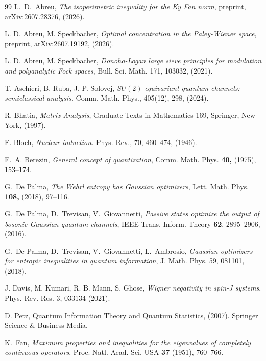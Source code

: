 \documentclass[12pt]{amsart}
\theoremstyle{plain}
\theoremstyle{definition}
\theoremstyle{remark}
\numberwithin{equation}{section}
\newcommand{\1}{\mathbf 1}
\begin{document}
\begin{thebibliography}{99}
 {\small L.~D.~Abreu, \emph{The isoperimetric inequality
for the Ky Fan norm}, preprint, \qquad arXiv:2607.28376, (2026). }

 {\small L. D. Abreu, M. Speckbacher, \emph{Optimal
concentration in the Paley-Wiener space}, preprint, \qquad arXiv:2607.19192,
(2026).}

 {\small L. D. Abreu, M. Speckbacher, \emph{Donoho-Logan
large sieve principles for modulation and polyanalytic Fock spaces}, Bull.
Sci. Math. 171, 103032, (2021).}

 {\small T. Aschieri, B. Ruba, J. P. Solovej,
$SU(2)$-\emph{equivariant quantum channels: semiclassical analysis.}
Comm. Math. Phys., 405(12), 298, (2024).}

 {\small R. Bhatia, \emph{Matrix Analysis}, Graduate Texts
in Mathematics 169, Springer, New York, (1997).}

 {\small F. Bloch, \emph{Nuclear induction. }Phys. Rev., 70,
460--474, (1946).}

 {\small F.~A. Berezin, \emph{General concept of
quantization}, Comm. Math. Phys. \textbf{40,} (1975), 153--174. }

 {\small G.~De Palma, \emph{The Wehrl entropy has
Gaussian optimizers}, Lett. Math. Phys. \textbf{108,} (2018), 97--116. }

 {\small G.~De Palma, D.~Trevisan, V.~Giovannetti, \emph{%
Passive states optimize the output of bosonic Gaussian quantum channels},
IEEE Trans. Inform. Theory \textbf{62}, 2895--2906, (2016). }

 {\small G.~De Palma, D.~Trevisan, V.~Giovannetti,
L.~Ambrosio, \emph{Gaussian optimizers for entropic inequalities in quantum
information}, J. Math. Phys. 59, 081101, (2018).}

 {\small J. Davis, M. Kumari, R. B. Mann, S. Ghose, \emph{%
Wigner negativity in spin-J systems}, Phys. Rev. Res. 3, 033134 (2021).}

 {\small D. Petz,} {\small Quantum Information Theory and
Quantum Statistics, (2007). Springer Science \& Business Media.}

 {\small K.~Fan, \emph{Maximum properties and inequalities for
the eigenvalues of completely continuous operators}, Proc. Natl. Acad. Sci.
USA \textbf{37} (1951), 760--766. }


\end{thebibliography}
\end{document}
